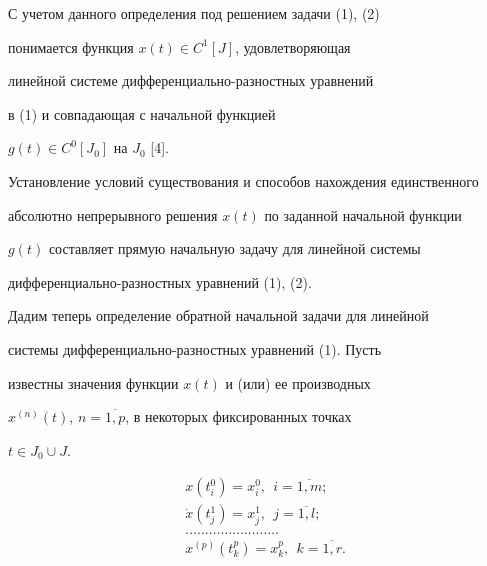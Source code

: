 С учетом данного определения под решением задачи (1), (2)


понимается функция $x(t)\in C^1[J]$, удовлетворяющая


линейной системе дифференциально-разностных уравнений


в (1) и совпадающая с начальной функцией


$g(t)\in C^0[J_0]$ на $J_0$ [4].





Установление условий существования и способов нахождения единственного 


абсолютно непрерывного решения $x(t)$ по заданной начальной функции 


$g(t)$ составляет прямую начальную задачу для линейной системы


дифференциально-разностных уравнений (1), (2).





Дадим теперь определение обратной начальной задачи для линейной


системы диф\-фе\-рен\-ци\-аль\-но-разностных уравнений (1). Пусть


известны значения функции $x(t)$ и (или) ее производных


$x^{(n)}(t)$, $n=\overline{1,p}$, в некоторых фиксированных точках


$t\in J_0 \cup J$.


\begin{equation}


\begin{split}


&x(t_i^0)=x_i^0,\ \ i=\overline{1,m};\\


&\Dot{x}(t_j^1)=x_j^1,\ \ j=\overline{1,l};\\


&\dotsc\dotsc\dotsc\dotsc\dotsc\dotsc\dotsc\dotsc\\


&x^{(p)}(t_k^p)=x_k^p,\ \ k=\overline{1,r}.


\end{split}


\end{equation}





